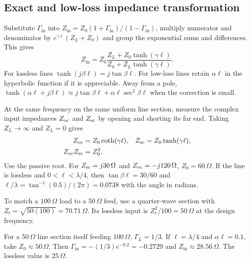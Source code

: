 \documentclass[12pt,a4paper]{article}
\begin{document}
\subsection{Exact and low-loss impedance transformation}
Substitute $\Gamma_{\mathrm{in}}$ into $Z_{\mathrm{in}}=Z_0(1+\Gamma_{\mathrm{in}})/(1-\Gamma_{\mathrm{in}})$, multiply numerator and denominator by $e^{\gamma\ell}(Z_L+Z_0)$ and group the exponential sums and differences. This gives
\[
 Z_{\mathrm{in}}=Z_0\frac{Z_L+Z_0\tanh(\gamma\ell)}{Z_0+Z_L\tanh(\gamma\ell)} .
\]
For lossless lines $\tanh(j\beta\ell)=j\tan\beta\ell$. For low-loss lines retain $\alpha\ell$ in the hyperbolic function if it is appreciable. Away from a pole, $\tanh(\alpha\ell+j\beta\ell)\approx j\tan\beta\ell+\alpha\ell\sec^2\beta\ell$ when the correction is small.
\begin{tcolorbox}[examplebox,title={Find characteristic impedance from open and short measurements}]
At the same frequency on the same uniform line section, measure the complex input impedances $Z_{\rm oc}$ and $Z_{\rm sc}$ by opening and shorting its far end. Taking $Z_L\to\infty$ and $Z_L=0$ gives
\[
\begin{aligned}
 Z_{\rm oc}&=Z_0\coth(\gamma\ell),&
 Z_{\rm sc}&=Z_0\tanh(\gamma\ell),\\
 Z_{\rm oc}Z_{\rm sc}&=Z_0^2 .
\end{aligned}
\]
Use the passive root. For $Z_{\rm sc}=j30\,\Omega$ and $Z_{\rm oc}=-j120\,\Omega$, $Z_0=60\,\Omega$. If the line is lossless and $0<\ell<\lambda/4$, then $\tan\beta\ell=30/60$ and $\ell/\lambda=\tan^{-1}(0.5)/(2\pi)=0.0738$ with the angle in radians.
\end{tcolorbox}

\begin{tcolorbox}[examplebox,title={Quarter-wave transformer and a low-loss comparison}]
To match a $100\,\Omega$ load to a $50\,\Omega$ feed, use a quarter-wave section with $Z_t=\sqrt{50(100)}=70.71\,\Omega$. Its lossless input is $Z_t^2/100=50\,\Omega$ at the design frequency.

For a $50\,\Omega$ line section itself feeding $100\,\Omega$, $\Gamma_L=1/3$. If $\ell=\lambda/4$ and $\alpha\ell=0.1$, take $Z_0\approx50\,\Omega$. Then $\Gamma_{\mathrm{in}}=-(1/3)e^{-0.2}=-0.2729$ and $Z_{\mathrm{in}}\approx28.56\,\Omega$. The lossless value is $25\,\Omega$.
\end{tcolorbox}
\end{document}
